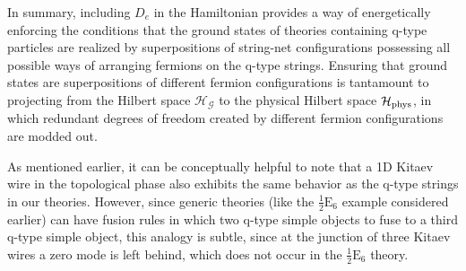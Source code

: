 \documentclass[12pt,a4paper]{article}
\newcommand{\mcg}{\mathcal{G}}
\newcommand{\mch}{\mathcal{H}}
\newcommand{\dave}[1]{{\color{ao(english)}\footnotesize{(DA) #1}}}
\newcommand{\halfesix}{\frac{1}{2}\text{E}_6}
\begin{document}
In summary, including $D_e$ in the Hamiltonian provides a way of energetically enforcing the conditions that the ground states of theories containing q-type particles are realized by superpositions of string-net configurations possessing all possible ways of arranging fermions on the q-type strings. 
Ensuring that ground states are superpositions of different fermion configurations is tantamount to projecting from the Hilbert space $\mch_\mcg$ to the physical Hilbert space $\mch_{\rm phys}$, in which redundant degrees of freedom created by different fermion configurations are modded out.%


As mentioned earlier, it can be conceptually helpful to note that a 1D Kitaev wire in the topological phase also exhibits the same behavior as the q-type strings in our theories.
However, since generic theories (like the $\halfesix$ example considered earlier) can have fusion rules in which two q-type simple objects to fuse to a third q-type simple object, this analogy is subtle, since at the junction of three Kitaev wires a zero mode is left behind, which does not occur in the $\halfesix$ theory. 

\end{document}
